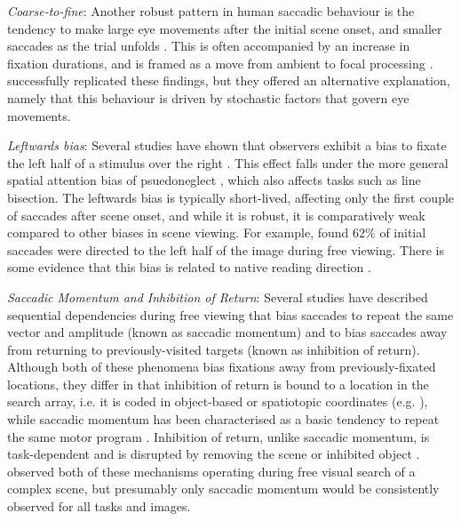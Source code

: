 \textit{Coarse-to-fine}: Another robust pattern in human saccadic behaviour is the tendency to make large eye movements after the initial scene onset, and smaller saccades as the trial unfolds \citep{over2007, pannasch2008,antes1974}. This is often accompanied by an increase in fixation durations,  and is framed as a move from ambient to focal processing \citep{follet2011,velichkovsky2002,unema2005}. \cite{godwin2014} successfully replicated these findings, but they offered an alternative explanation, namely that this behaviour is driven by stochastic factors that govern eye movements.

\textit{Leftwards bias}: Several studies have shown that observers exhibit a bias to fixate the left half of a stimulus over the right \citep{ossandon2014,nuthmann-matthias2014,learmonth2015,zelinsky1996, brandt1945}. This effect falls under the more general spatial attention bias of psuedoneglect \citep{bowers-heilman1980}, which also affects tasks such as line bisection. The leftwards bias is typically short-lived, affecting only the first couple of saccades after scene onset, and while it is robust, it is comparatively weak compared to other biases in scene viewing. For example,  \cite{dickinson-intraub2009} found $62\%$ of initial saccades were directed to the left half of the image during free viewing. There is some evidence that this bias is related to native reading direction \citep{friedrich2014}.

\textit{Saccadic Momentum and Inhibition of Return}: Several studies have described sequential dependencies during free viewing that bias saccades to repeat the same vector and amplitude (known as saccadic momentum) and to bias saccades away from returning to previously-visited targets (known as inhibition of return). Although both of these phenomena bias fixations away from previously-fixated locations, they differ in that inhibition of return is bound to a location in the search array, i.e. it is coded in object-based or spatiotopic coordinates (e.g. \cite{krueger-hunt2013}), while saccadic momentum has been characterised as a basic tendency to repeat the same motor program \citep{wang2011}. Inhibition of return, unlike saccadic momentum, is task-dependent \citep{dodd2009} and is disrupted by removing the scene or inhibited object  \citep{klein-macinnes1999, takeda-yagi2000}.  \cite{macinnes2014} observed both of these mechanisms operating during free visual search of a complex scene, but presumably only saccadic momentum would be consistently observed for all tasks and images. 

